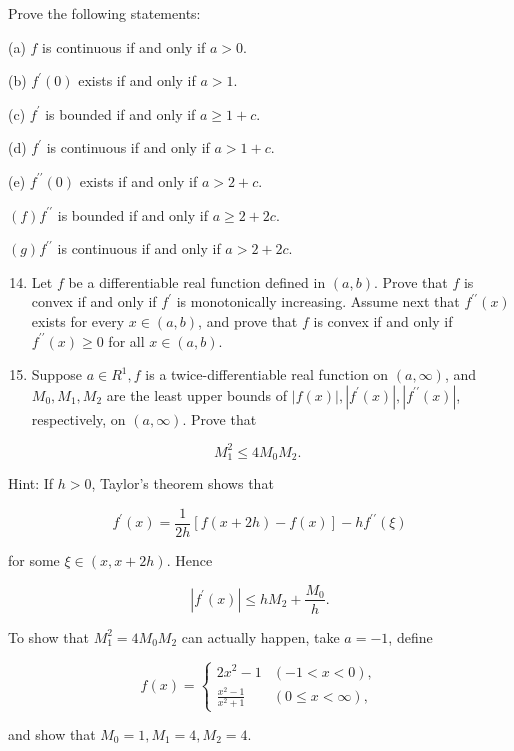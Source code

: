 \documentclass[10pt]{article}
\begin{document}
Prove the following statements:

(a) $f$ is continuous if and only if $a>0$.

(b) $f^{\prime}(0)$ exists if and only if $a>1$.

(c) $f^{\prime}$ is bounded if and only if $a \geq 1+c$.

(d) $f^{\prime}$ is continuous if and only if $a>1+c$.

(e) $f^{\prime \prime}(0)$ exists if and only if $a>2+c$.

$(f) f^{\prime \prime}$ is bounded if and only if $a \geq 2+2 c$.

$(g) f^{\prime \prime}$ is continuous if and only if $a>2+2 c$.

\begin{enumerate}
  \setcounter{enumi}{13}
  \item Let $f$ be a differentiable real function defined in $(a, b)$. Prove that $f$ is convex if and only if $f^{\prime}$ is monotonically increasing. Assume next that $f^{\prime \prime}(x)$ exists for every $x \in(a, b)$, and prove that $f$ is convex if and only if $f^{\prime \prime}(x) \geq 0$ for all $x \in(a, b)$.

  \item Suppose $a \in R^{1}, f$ is a twice-differentiable real function on $(a, \infty)$, and $M_{0}, M_{1}, M_{2}$ are the least upper bounds of $|f(x)|,\left|f^{\prime}(x)\right|,\left|f^{\prime \prime}(x)\right|$, respectively, on $(a, \infty)$. Prove that

\end{enumerate}

$$
M_{1}^{2} \leq 4 M_{0} M_{2} \text {. }
$$

Hint: If $h>0$, Taylor's theorem shows that

$$
f^{\prime}(x)=\frac{1}{2 h}[f(x+2 h)-f(x)]-h f^{\prime \prime}(\xi)
$$

for some $\xi \in(x, x+2 h)$. Hence

$$
\left|f^{\prime}(x)\right| \leq h M_{2}+\frac{M_{0}}{h} .
$$

To show that $M_{1}^{2}=4 M_{0} M_{2}$ can actually happen, take $a=-1$, define

$$
f(x)= \begin{cases}2 x^{2}-1 & (-1<x<0), \\ \frac{x^{2}-1}{x^{2}+1} & (0 \leq x<\infty),\end{cases}
$$

and show that $M_{0}=1, M_{1}=4, M_{2}=4$.
\end{document}

